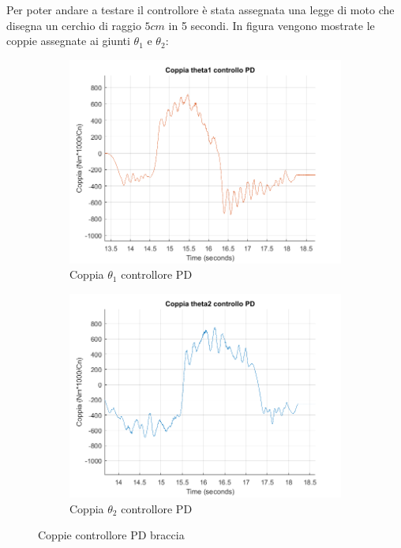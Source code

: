 \par Per poter andare a testare il controllore è stata assegnata una legge di moto che disegna un cerchio di raggio $5cm$ in 5 secondi. In figura vengono mostrate le coppie assegnate ai giunti $\theta_1$ e $\theta_2$:
\begin{figure}[!ht]
\begin{subfigure}{.5\textwidth}
  \centering
  \includegraphics[width=1\linewidth]{Immagini/Traiettorie/CoppiaT1PD}  
  \caption{Coppia $\theta_1$ controllore PD}
  \label{fig:sub-coppiaPD1}
\end{subfigure}
\begin{subfigure}{.5\textwidth}
  \centering
  \includegraphics[width=1\linewidth]{Immagini/Traiettorie/CoppiaT2PD}  
  \caption{Coppia $\theta_2$ controllore PD}
  \label{fig:sub-coppiaPD2}
\end{subfigure}
\caption{Coppie controllore PD braccia}
\end{figure}
